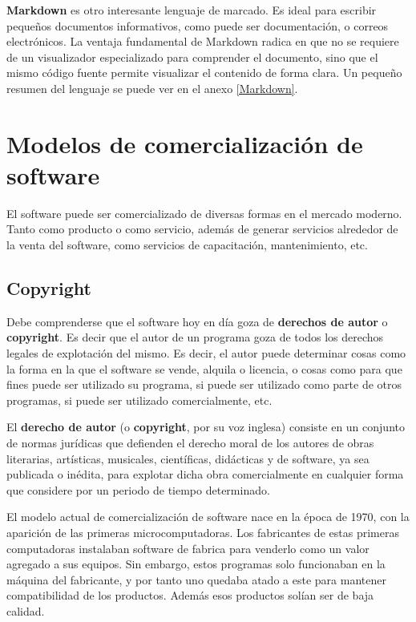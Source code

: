 \textbf{Markdown} es otro interesante lenguaje de marcado. Es ideal para
escribir pequeños documentos informativos, como puede ser documentación, o
correos electrónicos. La ventaja fundamental de Markdown radica en que no se
requiere de un visualizador especializado para comprender el documento, sino que
el mismo código fuente permite visualizar el contenido de forma clara. Un
pequeño resumen del lenguaje se puede ver en el anexo \ref{Markdown}.

\section{Modelos de comercialización de software}
\label{chap:informatica:sec:comercializacion}

El software puede ser comercializado de diversas formas en el mercado moderno.
Tanto como producto o como servicio, además de generar servicios alrededor de la
venta del software, como servicios de capacitación, mantenimiento, etc.

\subsection{Copyright}
\label{chap:informatica:subsec:copyright}

 Debe comprenderse que el software hoy
en día goza de \textbf{derechos de autor} o \textbf{copyright}. Es decir que el
autor de un programa goza de todos los derechos legales de explotación del
mismo. Es decir, el autor puede determinar cosas como la forma en la que el
software se vende, alquila o licencia, o cosas como para que fines puede ser
utilizado su programa, si puede ser utilizado como parte de otros programas, si
puede ser utilizado comercialmente, etc.

\begin{definition}
    El \textbf{derecho de autor} (o \textbf{copyright}, por su voz inglesa)
    consiste en un conjunto de normas jurídicas que defienden el derecho moral
    de los autores de obras literarias, artísticas, musicales, científicas,
    didácticas y de software, ya sea publicada o inédita, para explotar dicha
    obra comercialmente en cualquier forma que considere por un periodo de
    tiempo determinado.\autocite{oxford_copyright_2018}
\end{definition}

El modelo actual de comercialización de software nace en la época de 1970, con
la aparición de las primeras microcomputadoras. Los fabricantes de estas
primeras computadoras instalaban  software de fabrica para venderlo como un
valor agregado a sus equipos. Sin embargo, estos programas solo funcionaban en
la máquina del fabricante, y por tanto uno quedaba atado a este para mantener
compatibilidad de los productos. Además esos productos solían ser de baja
calidad.

